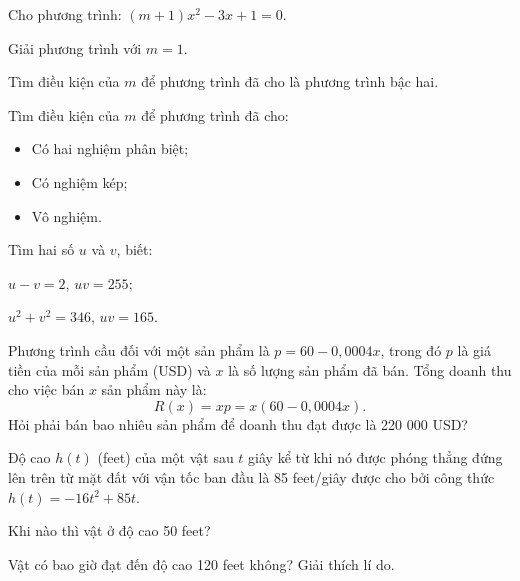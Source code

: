 \begin{practice}
\begin{questions}[resume=SBT]
        \answerline
        \answerline
        \answerline

        \item Cho phương trình: $(m+1)x^2-3x+1=0$.
        \begin{questions}
            \item Giải phương trình với $m=1$.
            \item Tìm điều kiện của $m$ để phương trình đã cho là phương trình bậc hai.
            \item Tìm điều kiện của $m$ để phương trình đã cho:
            \begin{itemize}[label={--}]
                \item Có hai nghiệm phân biệt;
                \item Có nghiệm kép;
                \item Vô nghiệm.
            \end{itemize}
        \end{questions}

        \answerline
        \answerline
        \answerline

        \item Tìm hai số $u$ và $v$, biết:
        \begin{questions}
            \item $u-v=2$, $uv=255$;
            \item $u^2+v^2=346$, $uv=165$.
        \end{questions}

        \answerline
        \answerline
        \answerline

        \item Phương trình cầu đối với một sản phẩm là $p=60-0{,}0004x$, trong đó $p$ là giá tiền của mỗi sản phẩm (USD) và $x$ là số lượng sản phẩm đã bán. Tổng doanh thu cho việc bán $x$ sản phẩm này là:
        \[
            R(x)=xp=x(60-0{,}0004x).
        \]
        Hỏi phải bán bao nhiêu sản phẩm để doanh thu đạt được là 220 000 USD?

        \answerline
        \answerline
        \answerline

        \item Độ cao $h(t)$ (feet) của một vật sau $t$ giây kể từ khi nó được phóng thẳng đứng lên trên từ mặt đất với vận tốc ban đầu là 85 feet/giây được cho bởi công thức $h(t)=-16t^2+85t$.
        \begin{questions}
            \item Khi nào thì vật ở độ cao 50 feet?
            \item Vật có bao giờ đạt đến độ cao 120 feet không? Giải thích lí do.
        \end{questions}


\end{questions}
\end{practice}
